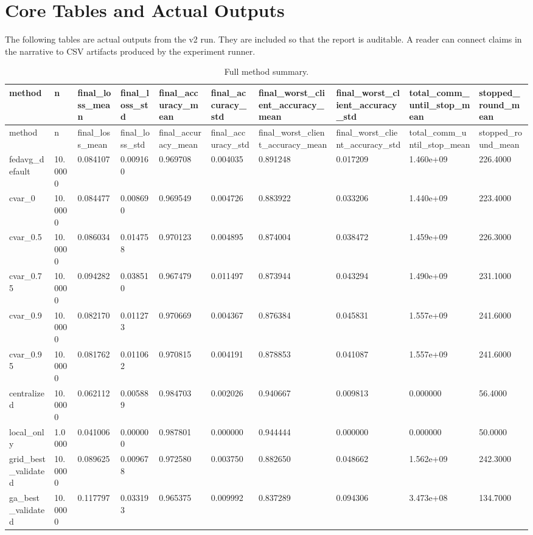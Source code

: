 \documentclass[11pt]{report}
\begin{document}
\chapter{Core Tables and Actual Outputs}
The following tables are actual outputs from the v2 run. They are included so that the report is
auditable. A reader can connect claims in the narrative to CSV artifacts produced by the experiment
runner.

\begin{longtable}{llllllllll}
\caption{Full method summary.}\\
\toprule
method & n & final\_loss\_mean & final\_loss\_std & final\_accuracy\_mean & final\_accuracy\_std & final\_worst\_client\_accuracy\_mean & final\_worst\_client\_accuracy\_std & total\_comm\_until\_stop\_mean & stopped\_round\_mean \\
\midrule
\endfirsthead
\toprule
method & n & final\_loss\_mean & final\_loss\_std & final\_accuracy\_mean & final\_accuracy\_std & final\_worst\_client\_accuracy\_mean & final\_worst\_client\_accuracy\_std & total\_comm\_until\_stop\_mean & stopped\_round\_mean \\
\midrule
\endhead
fedavg\_default & 10.0000 & 0.084107 & 0.009160 & 0.969708 & 0.004035 & 0.891248 & 0.017209 & 1.460e+09 & 226.4000 \\
cvar\_0 & 10.0000 & 0.084477 & 0.008690 & 0.969549 & 0.004726 & 0.883922 & 0.033206 & 1.440e+09 & 223.4000 \\
cvar\_0.5 & 10.0000 & 0.086034 & 0.014758 & 0.970123 & 0.004895 & 0.874004 & 0.038472 & 1.459e+09 & 226.3000 \\
cvar\_0.75 & 10.0000 & 0.094282 & 0.038510 & 0.967479 & 0.011497 & 0.873944 & 0.043294 & 1.490e+09 & 231.1000 \\
cvar\_0.9 & 10.0000 & 0.082170 & 0.011273 & 0.970669 & 0.004367 & 0.876384 & 0.045831 & 1.557e+09 & 241.6000 \\
cvar\_0.95 & 10.0000 & 0.081762 & 0.011062 & 0.970815 & 0.004191 & 0.878853 & 0.041087 & 1.557e+09 & 241.6000 \\
centralized & 10.0000 & 0.062112 & 0.005889 & 0.984703 & 0.002026 & 0.940667 & 0.009813 & 0.000000 & 56.4000 \\
local\_only & 1.0000 & 0.041006 & 0.000000 & 0.987801 & 0.000000 & 0.944444 & 0.000000 & 0.000000 & 50.0000 \\
grid\_best\_validated & 10.0000 & 0.089625 & 0.009678 & 0.972580 & 0.003750 & 0.882650 & 0.048662 & 1.562e+09 & 242.3000 \\
ga\_best\_validated & 10.0000 & 0.117797 & 0.033193 & 0.965375 & 0.009992 & 0.837289 & 0.094306 & 3.473e+08 & 134.7000 \\
\bottomrule
\end{longtable}
\end{document}
